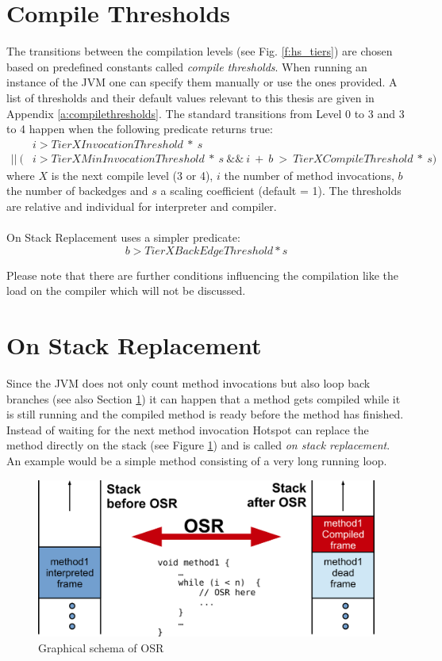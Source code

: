 \section{Compile Thresholds}
\label{s:compilethresholds}
The transitions between the compilation levels (see Fig. \ref{f:hs_tiers}) are chosen based on predefined constants called \textit{compile thresholds}. When running an instance of the JVM one can specify them manually or use the ones provided. A list of thresholds and their default values relevant to this thesis are given in Appendix \ref{a:compilethresholds}.
The standard transitions from Level 0 to 3 and 3 to 4 happen when the following predicate returns true:
\begin{align*}
& i > TierXInvocationThreshold \ * \ s \\
 || \ (&i > TierXMinInvocationThreshold \ * \ s \ \&\& \ i \ + \ b \ > \ TierXCompileThreshold \ * \ s) 
\end{align*}
where $X$ is the next compile level (3 or 4), $i$ the number of method invocations, $b$ the number of backedges and $s$ a scaling coefficient (default = 1).
The thresholds are relative and individual for interpreter and compiler.
\\\\
On Stack Replacement uses a simpler predicate:
$$b > TierXBackEdgeThreshold * s$$

Please note that there are further conditions influencing the compilation like the load on the compiler which will not be discussed.

\section{On Stack Replacement}
\label{s:onstackreplacement}
Since the JVM does not only count method invocations but also loop back branches (see also Section \ref{s:compilethresholds}) it can happen that a method gets compiled while it is still running and the compiled method is ready before the method has finished.
Instead of waiting for the next method invocation Hotspot can replace the method directly on the stack (see Figure \ref{f:osr}) and is called \textit{on stack replacement}.
An example would be a simple method consisting of a very long running loop.
\begin{figure}[ht]
  \begin{center}
    \centering
    \includegraphics{figures/osr.png}
    \caption{Graphical schema of OSR}
    \label{f:osr}
  \end{center}
\end{figure}

